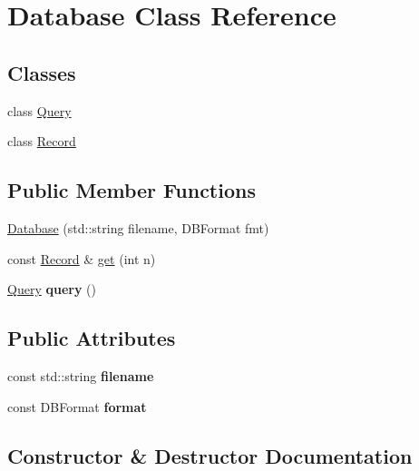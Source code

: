 \hypertarget{class_database}{}\section{Database Class Reference}
\label{class_database}
\subsection*{Classes}
\begin{DoxyCompactItemize}
\item 
class \hyperlink{class_database_1_1_query}{Query}
\item 
class \hyperlink{class_database_1_1_record}{Record}
\end{DoxyCompactItemize}
\subsection*{Public Member Functions}
\begin{DoxyCompactItemize}
\item 
\hyperlink{class_database_a0bb07a61d59006f6987bf95e7348a5fa}{Database} (std\+::string filename, D\+B\+Format fmt)
\item 
const \hyperlink{class_database_1_1_record}{Record} \& \hyperlink{class_database_a0ef7dce3f4521e498c574447ed4bfb34}{get} (int n)
\item 
\mbox{\label{class_database_af2f845cad2fe104cf26e054858765765}} 
\hyperlink{class_database_1_1_query}{Query} {\bfseries query} ()
\end{DoxyCompactItemize}
\subsection*{Public Attributes}
\begin{DoxyCompactItemize}
\item 
\mbox{\label{class_database_ac3400745011e67014a4323f7ed84e8be}} 
const std\+::string {\bfseries filename}
\item 
\mbox{\label{class_database_a776c1a8a04c4a79a40860f62d44f9383}} 
const D\+B\+Format {\bfseries format}
\end{DoxyCompactItemize}


\subsection{Constructor \& Destructor Documentation}
\mbox{\label{class_database_a0bb07a61d59006f6987bf95e7348a5fa}} 
